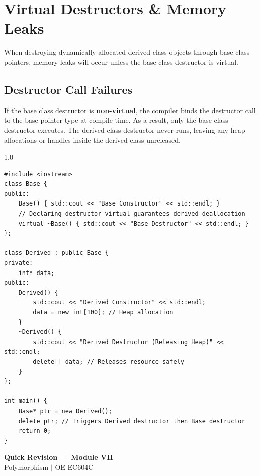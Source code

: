 \documentclass[12pt,a4paper]{article}
\begin{document}
\section{Virtual Destructors \& Memory Leaks}

When destroying dynamically allocated derived class objects through base class pointers, memory leaks will occur unless the base class destructor is virtual.

\subsection{Destructor Call Failures}
If the base class destructor is \textbf{non-virtual}, the compiler binds the destructor call to the base pointer type at compile time.
As a result, only the base class destructor executes. The derived class destructor never runs, leaving any heap allocations or handles inside the derived class unreleased.

\begin{tcolorbox}[examplebox, title={Code Example: Memory leak prevention via Virtual Destructors}]
\begin{spacing}{1.0}
\begin{verbatim}
#include <iostream>
class Base {
public:
    Base() { std::cout << "Base Constructor" << std::endl; }
    // Declaring destructor virtual guarantees derived deallocation
    virtual ~Base() { std::cout << "Base Destructor" << std::endl; }
};

class Derived : public Base {
private:
    int* data;
public:
    Derived() {
        std::cout << "Derived Constructor" << std::endl;
        data = new int[100]; // Heap allocation
    }
    ~Derived() {
        std::cout << "Derived Destructor (Releasing Heap)" << std::endl;
        delete[] data; // Releases resource safely
    }
};

int main() {
    Base* ptr = new Derived();
    delete ptr; // Triggers Derived destructor then Base destructor
    return 0;
}
\end{verbatim}
\end{spacing}
\end{tcolorbox}

\newpage
\begin{center}
  {\large\bfseries\color{myred} Quick Revision --- Module VII}\\[3pt]
  {\small\color{mydark} Polymorphism $|$ OE-EC604C}
\end{center}
\noindent{\color{myred}\rule{\linewidth}{1.2pt}}
\vspace{4pt}
\end{document}

